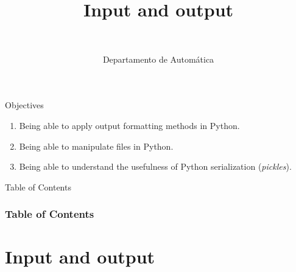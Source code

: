 \documentclass[10pt,compress]{beamer} %
\title[Input and output]{Input and output}
\author{\asignatura\\\carrera}
\institute{}
\date{Departamento de Automática}
\begin{document}
{\titlepageBlue
    \begin{frame}
        \titlepage
    \end{frame}
}

\begin{frame}[plain]{}
	\begin{block}{Objectives}
		\begin{enumerate}
		\item Being able to apply output formatting methods in Python.
		\item Being able to manipulate files in Python.
		\item Being able to understand the usefulness of Python serialization (\textit{pickles}).
		\end{enumerate}
	\end{block}
\end{frame}

{
\begin{frame}[shrink]{Table of Contents}
 \frametitle{Table of Contents}
 \tableofcontents
\end{frame}
}

\section{Input and output}
\end{document}
